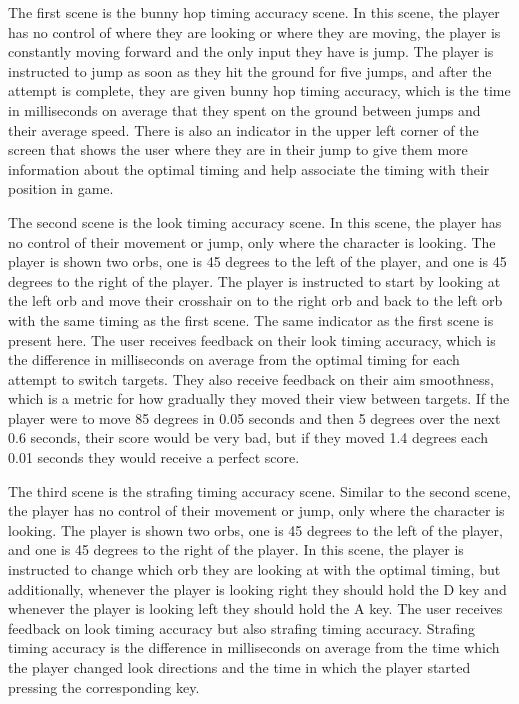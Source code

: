 \documentclass[10pt,twocolumn]{article}
\begin{document}
The first scene is the bunny hop timing accuracy scene. In this scene, the player has no control of where they are looking or where they are moving, the player is constantly moving forward and the only input they have is jump. The player is instructed to jump as soon as they hit the ground for five jumps, and after the attempt is complete, they are given bunny hop timing accuracy, which is the time in milliseconds on average that they spent on the ground between jumps and their average speed. There is also an indicator in the upper left corner of the screen that shows the user where they are in their jump to give them more information about the optimal timing and help associate the timing with their position in game. 

The second scene is the look timing accuracy scene. In this scene, the player has no control of their movement or jump, only where the character is looking. The player is shown two orbs, one is 45 degrees to the left of the player, and one is 45 degrees to the right of the player. The player is instructed to start by looking at the left orb and move their crosshair on to the right orb and back to the left orb with the same timing as the first scene. The same indicator as the first scene is present here. The user receives feedback on their look timing accuracy, which is the difference in milliseconds on average from the optimal timing for each attempt to switch targets. They also receive feedback on their aim smoothness, which is a metric for how gradually they moved their view between targets. If the player were to move 85 degrees in 0.05 seconds and then 5 degrees over the next 0.6 seconds, their score would be very bad, but if they moved 1.4 degrees each 0.01 seconds they would receive a perfect score.

The third scene is the strafing timing accuracy scene. Similar to the second scene, the player has no control of their movement or jump, only where the character is looking. The player is shown two orbs, one is 45 degrees to the left of the player, and one is 45 degrees to the right of the player. In this scene, the player is instructed to change which orb they are looking at with the optimal timing, but additionally, whenever the player is looking right they should hold the D key and whenever the player is looking left they should hold the A key. The user receives feedback on look timing accuracy but also strafing timing accuracy. Strafing timing accuracy is the difference in milliseconds on average from the time  which the player changed look directions and the time in which the player started pressing the corresponding key.
\end{document}
